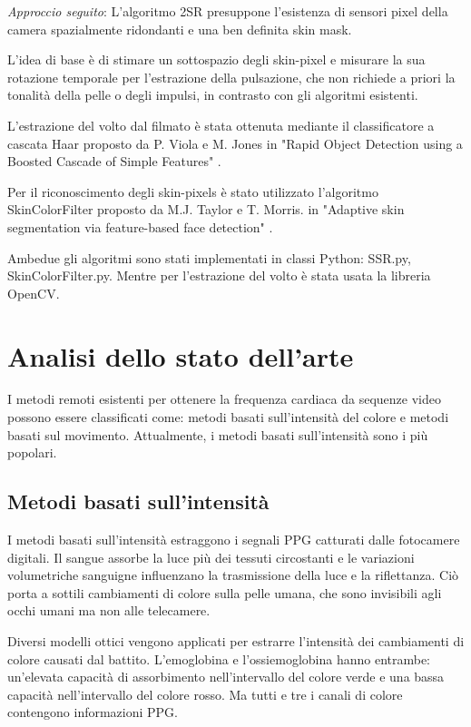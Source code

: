 \documentclass[journal,A4paper,compsoc,epsfig]{IEEEtran}
\begin{document}
    \emph{Approccio seguito}:
      L'algoritmo 2SR presuppone l'esistenza di sensori pixel della camera spazialmente ridondanti e una ben definita skin mask.
      
      L'idea di base è di stimare un sottospazio degli skin-pixel e misurare la sua rotazione temporale per l'estrazione della pulsazione, che non richiede a priori la tonalità della pelle o degli impulsi, in contrasto con gli algoritmi esistenti.
      
      L'estrazione del volto dal filmato è stata ottenuta mediante il classificatore a cascata Haar proposto da P. Viola e M. Jones in "Rapid Object Detection using a Boosted Cascade of Simple Features" \cite{skin_color_filter}.
      
      Per il riconoscimento degli skin-pixels è stato utilizzato l'algoritmo SkinColorFilter proposto da M.J. Taylor e T. Morris. in "Adaptive skin segmentation via feature-based face detection" \cite{adaptive_skin_segmentation}.
      
      Ambedue gli algoritmi sono stati implementati in classi Python: SSR.py, SkinColorFilter.py. Mentre per l'estrazione del volto è stata usata la libreria OpenCV.

  \section{Analisi dello stato dell'arte}
    \label{sec:Analisi}
    I metodi remoti esistenti per ottenere la frequenza cardiaca da sequenze video possono essere classificati come: metodi basati sull'intensità del colore e metodi basati sul movimento.
    Attualmente, i metodi basati sull'intensità sono i più popolari.

    \subsection{Metodi basati sull'intensità}
      I metodi basati sull'intensità estraggono i segnali PPG catturati dalle fotocamere digitali.
      Il sangue assorbe la luce più dei tessuti circostanti e le variazioni volumetriche sanguigne influenzano la trasmissione della luce e la riflettanza.
      Ciò porta a sottili cambiamenti di colore sulla pelle umana, che sono invisibili agli occhi umani ma non alle telecamere.
      
      Diversi modelli ottici vengono applicati per estrarre l'intensità dei cambiamenti di colore causati dal battito.
      L'emoglobina e l'ossiemoglobina hanno entrambe: un'elevata capacità di assorbimento nell'intervallo del colore verde e una bassa capacità nell'intervallo del colore rosso.
      Ma tutti e tre i canali di colore contengono informazioni PPG.
      
\end{document}
